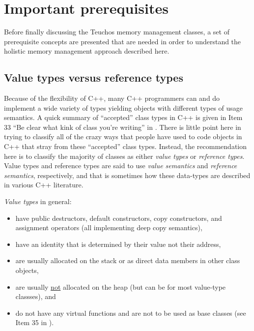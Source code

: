 \documentclass[pdf,ps2pdf,11pt]{SANDreport}
\begin{document}
%
{}\section{Important prerequisites}
\label{sec:important-prerequisites}
%

Before finally discussing the Teuchos memory management classes, a set
of prerequisite concepts are presented that are needed in order to
understand the holistic memory management approach described here.


%
{}\subsection{Value types versus reference types}
\label{sec:value-and-reference-types}
%

Because of the flexibility of C++, many C++ programmers can and do
implement a wide variety of types yielding objects with different
types of usage semantics.  A quick summary of ``accepted'' class types
in C++ is given in Item 33 ``Be clear what kink of class you're
writing'' in {}\cite{C++CodingStandards05}.  There is little point
here in trying to classify all of the crazy ways that people have used
to code objects in C++ that stray from these ``accepted'' class types.
Instead, the recommendation here is to classify the majority of
classes as either {}\textit{value types} or {}\textit{reference
types}.  Value types and reference types are said to use
{}\textit{value semantics} and {}\textit{reference semantics},
respectively, and that is sometimes how these data-types are described
in various C++ literature.

{}\textit{Value types} in general:

\begin{itemize}

{}\item have public destructors, default constructors, copy
constructors, and assignment operators (all implementing deep copy
semantics),

{}\item have an identity that is determined by their value not their
address,

{}\item are usually allocated on the stack or as direct data members
in other class objects,

{}\item are usually {}\underline{not} allocated on the heap (but can
be for most value-type classses), and

{}\item do not have any virtual functions and are not to be used as
base classes (see Item 35 in {}\cite{C++CodingStandards05}).

\end{itemize}
\end{document}
